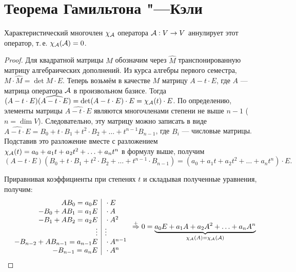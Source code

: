 \section{Теорема Гамильтона "---Кэли}

\begin{theorem}
    Характеристический многочлен $\chi_{\mathcal{A}}$ оператора $\mathcal{A}: V \to V$ аннулирует этот оператор, т.\,е. $\chi_{\mathcal{A}}(\mathcal{A}) = 0$.
\end{theorem}

\begin{proof}
    Для квадратной матрицы $M$ обозначим через $\widehat{M}$ транспонированную матрицу алгебраических дополнений. Из курса алгебры первого семестра, $M \cdot \widehat{M} = \det M \cdot E$. Теперь возьмём в качестве $M$ матрицу $A - t \cdot E$, где $A$ --- матрица оператора $\mathcal{A}$ в произвольном базисе. Тогда $(A - t \cdot E)(\widehat{A - t \cdot E}) = \det (A - t \cdot E) \cdot E = \chi_{\mathcal{A}}(t) \cdot E$. По определению, элементы матрицы $\widehat{A - t \cdot E}$ являются многочленами степени не выше $n - 1$ ($n = \dim V$). Следовательно, эту матрицу можно записать в виде $\widehat{A - t \cdot E} = B_0 + t \cdot B_1 + t^2 \cdot B_2 + \ldots + t^{n - 1}B_{n - 1}$, где $B_i$ --- числовые матрицы. Подставив это разложение вместе с разложением $\chi_{\mathcal{A}}(t) = a_0 + a_1t + a_2t^2 + \ldots + a_nt^n$ в формулу выше, получим
\[
    (A - t \cdot E)(B_0 + t \cdot B_1 + t^2 \cdot B_2 + \ldots + t^{n - 1} \cdot B_{n - 1}) = (a_0 + a_1t + a_2t^2 + \ldots + a_nt^n) \cdot E.
\]

Приравнивая коэффициенты при степенях $t$ и складывая полученные уравнения, получим:
\[
    \begin{array}{r | l}
        AB_0 = a_0E & {} \cdot E\\
        -B_0 + AB_1 = a_1E & {} \cdot A\\
        -B_1 + AB_2 = a_2E & {} \cdot A^2\\
        \vdots & \vdots\\
        -B_{n - 2} + AB_{n - 1} = a_{n - 1}E & {} \cdot A^{n - 1}\\
        -B_{n - 1} = a_nE & {} \cdot A^n
    \end{array} \overset{+}{\Rightarrow} 0 = \underbrace{a_0E + a_1A + a_2A^2 + \ldots + a_nA^n}_{\chi_{\mathcal{A}}(A) = \chi_{\mathcal{A}}(\mathcal{A})}
\]
\end{proof}


